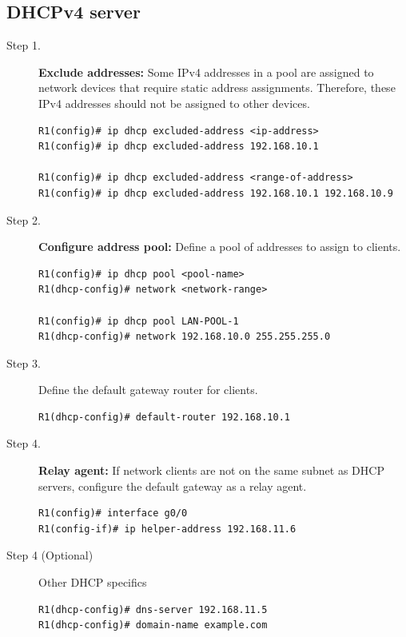 \subsection{DHCPv4 server}

\begin{description}
\item[Step 1.] \textbf{Exclude addresses:} Some IPv4 addresses in a pool are assigned to network devices that require static address assignments. Therefore, these IPv4 addresses should not be assigned to other devices.

\begin{verbatim}
R1(config)# ip dhcp excluded-address <ip-address>
R1(config)# ip dhcp excluded-address 192.168.10.1

R1(config)# ip dhcp excluded-address <range-of-address>
R1(config)# ip dhcp excluded-address 192.168.10.1 192.168.10.9
\end{verbatim}

\item[Step 2.] \textbf{Configure address pool:} Define a pool of addresses to assign to clients.

\begin{verbatim}
R1(config)# ip dhcp pool <pool-name>
R1(dhcp-config)# network <network-range>

R1(config)# ip dhcp pool LAN-POOL-1
R1(dhcp-config)# network 192.168.10.0 255.255.255.0
\end{verbatim}

\item[Step 3.] Define the default gateway router for clients. 

\begin{verbatim}
R1(dhcp-config)# default-router 192.168.10.1
\end{verbatim}

\item[Step 4.] \textbf{Relay agent:} If network clients are not on the same subnet as DHCP servers, configure the default gateway as a relay agent.

\begin{verbatim}
R1(config)# interface g0/0
R1(config-if)# ip helper-address 192.168.11.6
\end{verbatim}

\item[Step 4 (Optional)] Other DHCP specifics

\begin{verbatim}
R1(dhcp-config)# dns-server 192.168.11.5
R1(dhcp-config)# domain-name example.com
\end{verbatim}


\end{description}
